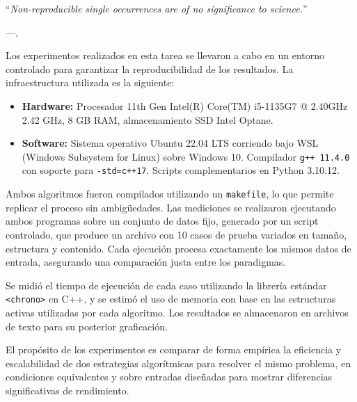 
\epigraph{``\textit{Non-reproducible single occurrences are of no significance to
science.}''}{---\citeauthor{popper2005logic},\citeyear{popper2005logic} \cite{popper2005logic}}
Los experimentos realizados en esta tarea se llevaron a cabo en un entorno controlado para garantizar la reproducibilidad de los resultados. La infraestructura utilizada es la siguiente:

\begin{itemize}
    \item \textbf{Hardware:} Procesador	11th Gen Intel(R) Core(TM) i5-1135G7 @ 2.40GHz   2.42 GHz, 8 GB RAM, almacenamiento SSD Intel Optane.
    \item \textbf{Software:} Sistema operativo Ubuntu 22.04 LTS corriendo bajo WSL (Windows Subsystem for Linux) sobre Windows 10. Compilador \texttt{g++ 11.4.0} con soporte para \texttt{-std=c++17}. Scripts complementarios en Python 3.10.12.
\end{itemize}

Ambos algoritmos fueron compilados utilizando un \texttt{makefile}, lo que permite replicar el proceso sin ambigüedades. Las mediciones se realizaron ejecutando ambos programas sobre un conjunto de datos fijo, generado por un script controlado, que produce un archivo con 10 casos de prueba variados en tamaño, estructura y contenido. Cada ejecución procesa exactamente los mismos datos de entrada, asegurando una comparación justa entre los paradigmas.

Se midió el tiempo de ejecución de cada caso utilizando la librería estándar \texttt{<chrono>} en C++, y se estimó el uso de memoria con base en las estructuras activas utilizadas por cada algoritmo. Los resultados se almacenaron en archivos de texto para su posterior graficación.

El propósito de los experimentos es comparar de forma empírica la eficiencia y escalabilidad de dos estrategias algorítmicas para resolver el mismo problema, en condiciones equivalentes y sobre entradas diseñadas para mostrar diferencias significativas de rendimiento.
